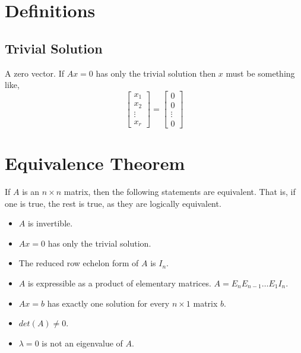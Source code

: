 \documentclass[12pt]{article}
\begin{document}
\section{Definitions}


\subsection{Trivial Solution}

A zero vector. If $Ax = 0$ has only the trivial solution then $x$ must be something like,
$$
\begin{bmatrix}
    x_1\\
    x_2\\
    \vdots\\
    x_r
\end{bmatrix}
=
\begin{bmatrix}
    0\\
    0\\
    \vdots\\
    0
\end{bmatrix}
$$


\section{Equivalence Theorem}

If $A$ is an $n \times n$ matrix, then the following statements are equivalent. That is, if one is true, the rest is true, as they are logically equivalent.
\begin{itemize}
    \item $A$ is invertible.
    \item $Ax = 0$ has only the trivial solution.
    \item The reduced row echelon form of $A$ is $I_n$.
    \item $A$ is expressible as a product of elementary matrices. $A = E_nE_{n-1}\dots E_1I_n$.
    \item $Ax = b$ has exactly one solution for every $n \times 1$ matrix $b$.
    \item $det(A) \neq 0$.
    \item $\lambda = 0$ is not an eigenvalue of $A$.
\end{itemize}
\end{document}
